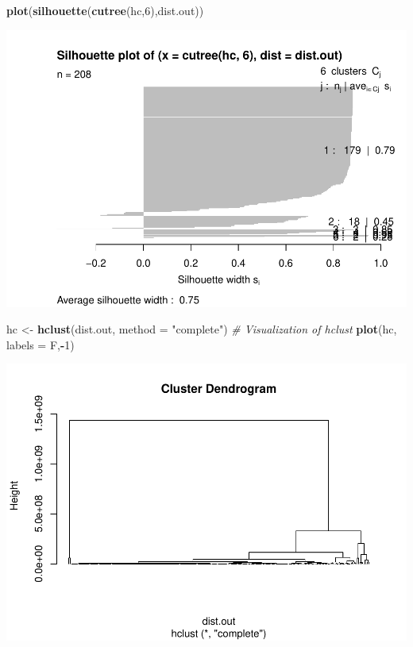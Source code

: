 \documentclass[
]{article}
\newenvironment{Shaded}{\begin{snugshade}}{\end{snugshade}}
\newcommand{\CommentTok}[1]{\textcolor[rgb]{0.56,0.35,0.01}{\textit{#1}}}
\newcommand{\DataTypeTok}[1]{\textcolor[rgb]{0.13,0.29,0.53}{#1}}
\newcommand{\DecValTok}[1]{\textcolor[rgb]{0.00,0.00,0.81}{#1}}
\newcommand{\KeywordTok}[1]{\textcolor[rgb]{0.13,0.29,0.53}{\textbf{#1}}}
\newcommand{\NormalTok}[1]{#1}
\newcommand{\OperatorTok}[1]{\textcolor[rgb]{0.81,0.36,0.00}{\textbf{#1}}}
\newcommand{\StringTok}[1]{\textcolor[rgb]{0.31,0.60,0.02}{#1}}
\begin{document}
\begin{Shaded}
\begin{Highlighting}[]
\KeywordTok{plot}\NormalTok{(}\KeywordTok{silhouette}\NormalTok{(}\KeywordTok{cutree}\NormalTok{(hc,}\DecValTok{6}\NormalTok{),dist.out))}
\end{Highlighting}
\end{Shaded}

\includegraphics{Assignment1_files/figure-latex/unnamed-chunk-26-2.pdf}

\begin{Shaded}
\begin{Highlighting}[]
\NormalTok{hc <-}\StringTok{ }\KeywordTok{hclust}\NormalTok{(dist.out,}
             \DataTypeTok{method =} \StringTok{"complete"}\NormalTok{)}
\CommentTok{# Visualization of hclust}
\KeywordTok{plot}\NormalTok{(hc, }\DataTypeTok{labels =}\NormalTok{ F,}\OperatorTok{-}\DecValTok{1}\NormalTok{)}
\end{Highlighting}
\end{Shaded}

\includegraphics{Assignment1_files/figure-latex/unnamed-chunk-26-3.pdf}
\end{document}
